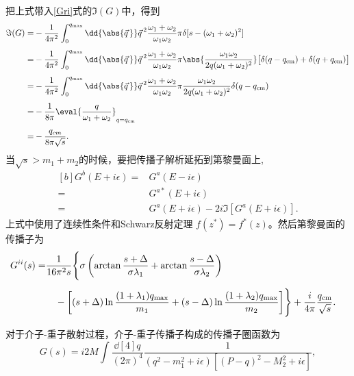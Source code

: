把上式带入\eqref{Gri}式的$\Im(G)$中，得到
\begin{equation}
	\begin{aligned}[b]
		\Im(G)=&-\frac{1}{4\pi^2}\int^{q_{\text{max}}}_{0}\dd{\abs{\vec{q\,}}}\vec{q\,}^2\frac{\omega_{1}+\omega_{2}}{\omega_{1}\omega_{2}}\pi\delta[s-(\omega_{1}+\omega_{2})^2]\\[1ex]
	=&-\frac{1}{4\pi^2}\int^{q_{\text{max}}}_{0}\dd{\abs{\vec{q\,}}}\vec{q\,}^2\frac{\omega_{1}+\omega_{2}}{\omega_{1}\omega_{2}}\pi\abs{\frac{\omega_{1}\omega_{2}}{2q(\omega_{1}+\omega_{2})^2}}\big[\delta(q-q_{\text{cm}})+\delta(q+q_{\text{cm}})\big]\\[1ex]
	=&-\frac{1}{4\pi^2}\int^{q_{\text{max}}}_{0}\dd{\abs{\vec{q\,}}}\vec{q\,}^2\frac{\omega_{1}+\omega_{2}}{\omega_{1}\omega_{2}}\pi\frac{\omega_{1}\omega_{2}}{2q(\omega_{1}+\omega_{2})^2}\delta(q-q_{\text{cm}})\\[1ex]
	=&-\frac{1}{8\pi}\eval{\frac{q}{\omega_{1}+\omega_{2}}}_{q=q_{\text{cm}}}\\[1ex]
	=&-\frac{q_{cm}}{8\pi\sqrt{s}}.
	\end{aligned}
\end{equation}
当$\sqrt{s}>m_{1}+m_{2}$的时候，要把传播子解析延拓到第\uppercase\expandafter{}黎曼面上,
\begin{equation}
	\begin{aligned}[b]
	G^{b}(E+i\epsilon)=&G^{a}(E-i\epsilon)\\
	=&G^{a*}(E+i\epsilon)\\
	=&G^{a}(E+i\epsilon)-2i\Im[G^{a}(E+i\epsilon)].
	\end{aligned}
\end{equation}
上式中使用了连续性条件和Schwarz反射定理 $f(z^{*})=f^{*}(z)$。然后第\uppercase\expandafter{}黎曼面的传播子为
\begin{equation}
	\begin{aligned}
		G^{\uppercase\expandafter{\romannumeral2}}(s)=&\frac{1}{16\pi^2s}\Biggl\{\sigma\left(\arctan\frac{s+\Delta}{\sigma\lambda_{1}}+\arctan\frac{s-\Delta}{\sigma\lambda_{2}}\right)&\\[1ex]
		&\quad-\left[(s+\Delta)\ln\frac{(1+\lambda_{1})q_{\text{max}}}{m_{1}}+(s-\Delta)\ln\frac{(1+\lambda_{2})q_{\text{max}}}{m_{2}}\right]\Biggr\}+\frac{i}{4\pi}\frac{q_{\text{cm}}}{\sqrt{s}}.
	\end{aligned}
\end{equation}
\par
对于介子-重子散射过程，介子-重子传播子构成的传播子圈函数为
\begin{equation}
	G(s)=i2M\int\frac{\dd[4]{q}}{(2\pi)^4}\frac{1}{(q^2-m_{1}^2+i\epsilon)[(P-q)^2-M_{2}^2+i\epsilon]},
\end{equation}
